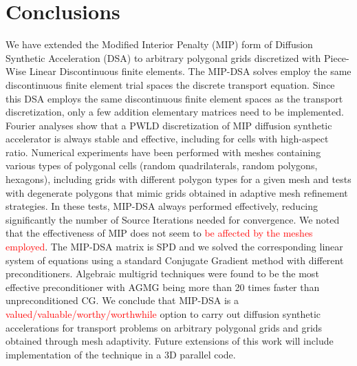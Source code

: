 \section{Conclusions} \label{sec_conc}
We have extended the Modified Interior Penalty (MIP) form of Diffusion Synthetic Acceleration (DSA) 
to arbitrary polygonal grids discretized with Piece-Wise Linear Discontinuous finite elements. 
The MIP-DSA solves employ the same discontinuous finite element trial spaces  
the discrete \sn transport equation.
Since this DSA employs the same discontinuous finite element spaces as the \sn transport discretization,
only a few addition elementary matrices need to be implemented. 
%
%
%
Fourier analyses show that a PWLD discretization of MIP diffusion synthetic accelerator 
is always stable and effective, including for cells with high-aspect ratio. 
%
Numerical experiments have been performed with meshes containing various types of polygonal cells
(random quadrilaterals, random polygons, hexagons), including
grids with different polygon types for a given mesh and tests with degenerate polygons that mimic
grids obtained in adaptive mesh refinement strategies. In these tests, MIP-DSA always performed effectively,
reducing significantly the number of Source Iterations needed for convergence. 
We noted that the effectiveness of MIP does not seem to \textcolor{red}{be affected by the meshes employed}. 
%
The MIP-DSA  matrix is SPD and we solved the corresponding linear system of equations using a standard Conjugate
Gradient method with different preconditioners. 
Algebraic multigrid techniques were found to be the most effective preconditioner with AGMG being more than 20 times
faster than unpreconditioned CG.
We conclude that MIP-DSA is a \textcolor{red}{valued/valuable/worthy/worthwhile} option to
carry out diffusion synthetic accelerations for \sn transport problems on arbitrary polygonal grids and 
grids obtained through mesh adaptivity.
Future extensions of this work will include implementation of the technique in a 3D parallel \sn code.



